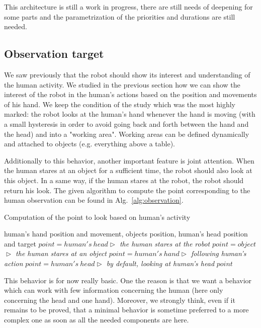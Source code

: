 \documentclass[english,a4paper,11pt,twoside]{StyleThese}
\begin{document}
This architecture is still a work in progress, there are still needs of deepening for some parts and the parametrization of the priorities and durations are still needed.

\subsection{Observation target}

We saw previously that the robot should show its interest and understanding of the human activity. We studied in the previous section how we can show the interest of the robot in the human's actions based on the position and movements of his hand. We keep the condition of the study which was the most highly marked: the robot looks at the human's hand whenever the hand is moving (with a small hysteresis in order to avoid going back and forth between the hand and the head) and into a "working area". Working areas can be defined dynamically and attached to objects (e.g. everything above a table).

Additionally to this behavior, another important feature is joint attention. When the human stares at an object for a sufficient time, the robot should also look at this object. In a same way, if the human stares at the robot, the robot should return his look. The given algorithm to compute the point corresponding to the human observation can be found in Alg.~\ref{alg:observation}.


\begin{algorithm}
\caption{Computation of the point to look based on human's activity}
\label{alg:observation}
\begin{algorithmic}
\REQUIRE human's hand position and movement, objects position, human's  head position and target
\STATE $point = human's \ head$\hfill \textit{$\vartriangleright$ the human stares at the robot}
\STATE $point = object$\hfill \textit{$\vartriangleright$ the human stares at an object}
\STATE $point = human's \ hand$\hfill \textit{$\vartriangleright$ following human's action}
\ELSE
\STATE $point = human's \ head$\hfill \textit{$\vartriangleright$ by default, looking at human's head}
\ENDIF
\RETURN $point$
\end{algorithmic}
\end{algorithm}

This behavior is for now really basic. One the reason is that we want a behavior which can work with few information concerning the human (here only concerning the head and one hand). Moreover, we strongly think, even if it remains to be proved, that a minimal behavior is sometime preferred to a more complex one as soon as all the needed components are here.
\end{document}
